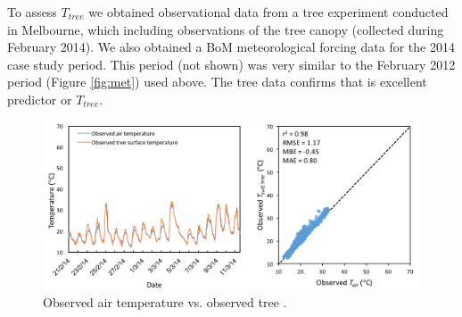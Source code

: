 \documentclass[final,3p,times,authoryear]{elsarticle}
\begin{document}
To assess $T_{tree}$ we obtained observational data from a tree experiment conducted in Melbourne, which including  observations of the tree canopy (collected during February 2014). We also obtained a BoM meteorological forcing data for the 2014 case study period.  This period (not shown) was very similar to the February 2012 period (Figure \ref{fig:met}) used above. The tree data confirms that  is excellent predictor or $T_{tree}$. 

\begin{figure}
\begin{center}
\end{center}
\includegraphics[width=1\textwidth,keepaspectratio]{figure13.png}
 \caption{Observed air temperature vs. observed tree .} \label{fig:TreeTsurfvsTair}
\end{figure}





\end{document}
